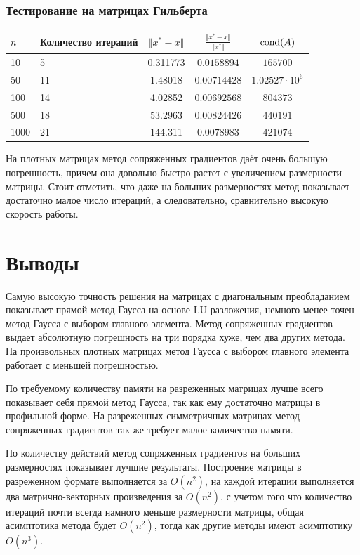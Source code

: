 \documentclass[english]{article}
\begin{document}
\subsubsection{Тестирование на матрицах Гильберта}
\begin{center}
  \begin{longtable}{l|l|c|c|c}
    \(n\) & Количество итераций & \(\Vert x^* - x \Vert\) & \(\frac{\Vert x^* - x \Vert}{\Vert x^* \Vert}\) & \(\mathop{\rm cond}(A) \)\\
    \hline
    10 & 5 & 0.311773 & \(0.0158894\) & \(165700\) \\
    50 & 11 & 1.48018 & \(0.00714428\) & \(1.02527 \cdot 10^{6}\) \\
    100 & 14 & 4.02852 & \(0.00692568\) & \(804373\) \\
    500 & 18 & 53.2963 & \(0.00824426\) & \(440191\) \\
    1000 & 21 & 144.311 & \(0.0078983\) & \(421074\)
  \end{longtable}
\end{center}
На плотных матрицах метод сопряженных градиентов даёт очень большую
погрешность, причем она довольно быстро растет с увеличением
размерности матрицы. Стоит отметить, что даже на больших размерностях
метод показывает достаточно малое число итераций, а следовательно,
сравнительно высокую скорость работы.
\section{Выводы}
Самую высокую точность решения на матрицах с диагональным
преобладанием показывает прямой метод Гаусса на основе LU-разложения,
немного менее точен метод Гаусса с выбором главного элемента. Метод
сопряженных градиентов выдает абсолютную погрешность на три порядка
хуже, чем два других метода. На произвольных плотных матрицах метод
Гаусса с выбором главного элемента работает с меньшей погрешностью.

По требуемому количеству памяти на разреженных матрицах лучше всего
показывает себя прямой метод Гаусса, так как ему достаточно матрицы в
профильной форме. На разреженных симметричных матрицах метод
сопряженных градиентов так же требует малое количество памяти.

По количеству действий метод сопряженных градиентов на больших
размерностях показывает лучшие результаты. Построение матрицы в
разреженном формате выполняется за \(O(n^2)\), на каждой итерации
выполняется два матрично-векторных произведения за \(O(n^2)\), с
учетом того что количество итераций почти всегда намного меньше
размерности матрицы, общая асимптотика метода будет \(O(n^2)\),
тогда как другие методы имеют асимптотику \(O(n^3)\).
\end{document}
